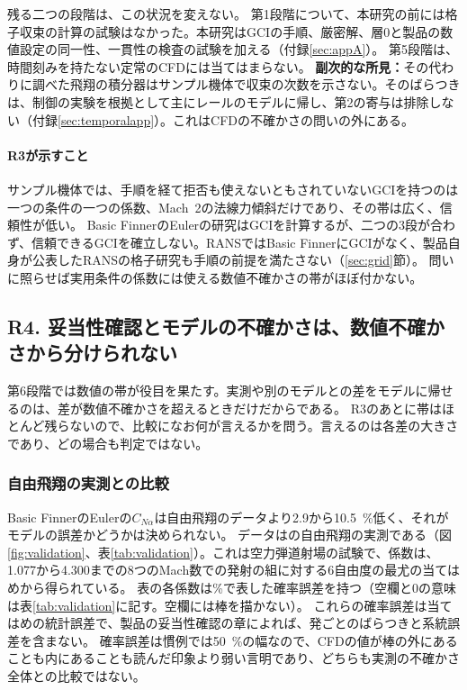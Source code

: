 \documentclass[twocolumn]{labreport}
\newcommand{\CNa}{C_{N\alpha}}
\begin{document}
残る二つの段階は、この状況を変えない。
第1段階について、本研究の前には格子収束の計算の試験はなかった。本研究はGCIの手順、厳密解、層0と製品の数値設定の同一性、一貫性の検査の試験を加える（付録\ref{sec:appA}）。
第5段階は、時間刻みを持たない定常のCFDには当てはまらない。
\textbf{副次的な所見：}その代わりに調べた飛翔の積分器はサンプル機体で収束の次数を示さない。そのばらつきは、制御の実験を根拠として主にレールのモデルに帰し、第2の寄与は排除しない（付録\ref{sec:temporalapp}）。これはCFDの不確かさの問いの外にある。

\paragraph{R3が示すこと}
サンプル機体では、手順を経て拒否も使えないともされていないGCIを持つのは一つの条件の一つの係数、Mach~2の法線力傾斜だけであり、その帯は広く、信頼性が低い。
Basic FinnerのEulerの研究はGCIを計算するが、二つの3段が合わず、信頼できるGCIを確立しない。RANSではBasic FinnerにGCIがなく、製品自身が公表したRANSの格子研究も手順の前提を満たさない（\ref{sec:grid}節）。
問いに照らせば実用条件の係数には使える数値不確かさの帯がほぼ付かない。

\subsection{R4. 妥当性確認とモデルの不確かさは、数値不確かさから分けられない}
\label{sec:r4}

第6段階では数値の帯が役目を果たす。実測や別のモデルとの差をモデルに帰せるのは、差が数値不確かさを超えるときだけだからである。
R3のあとに帯はほとんど残らないので、比較になお何が言えるかを問う。言えるのは各差の大きさであり、どの場合も判定ではない。

\subsubsection{自由飛翔の実測との比較}
\label{sec:validation}

Basic FinnerのEulerの$\CNa$は自由飛翔のデータより2.9から10.5~\%低く、それがモデルの誤差かどうかは決められない。
データは\citet{dupuis1997}の自由飛翔の実測である（図\ref{fig:validation}、表\ref{tab:validation}）。これは空力弾道射場の試験で、係数は、1.077から4.300までの8つのMach数での発射の組に対する6自由度の最尤の当てはめから得られている。
表の各係数は\%で表した確率誤差を持つ（空欄と0の意味は表\ref{tab:validation}に記す。空欄には棒を描かない）。
これらの確率誤差は当てはめの統計誤差で、製品の妥当性確認の章によれば、発ごとのばらつきと系統誤差を含まない。
確率誤差は慣例では50~\%の幅なので、CFDの値が棒の外にあることも内にあることも読んだ印象より弱い言明であり、どちらも実測の不確かさ全体との比較ではない。
\end{document}
